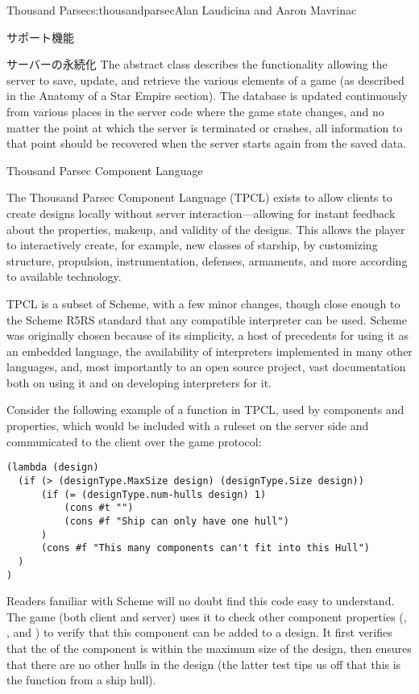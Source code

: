 \begin{aosachapter}{Thousand Parsec}{s:thousandparsec}{Alan Laudicina and Aaron Mavrinac}
\begin{aosasect1}{サポート機能}
\begin{aosasect2}{サーバーの永続化}
The abstract  class describes the functionality
allowing the server to save, update, and retrieve the various elements
of a game (as described in the Anatomy of a Star Empire section). The
database is updated continuously from various places in the server
code where the game state changes, and no matter the point at which
the server is terminated or crashes, all information to that point
should be recovered when the server starts again from the saved data.

\end{aosasect2}

\begin{aosasect2}{Thousand Parsec Component Language}

The Thousand Parsec Component Language (TPCL) exists to allow clients
to create designs locally without server interaction---allowing for
instant feedback about the properties, makeup, and validity of the
designs. This allows the player to interactively create, for example,
new classes of starship, by customizing structure, propulsion,
instrumentation, defenses, armaments, and more according to available
technology.

TPCL is a subset of Scheme, with a few minor changes, though close
enough to the Scheme R5RS standard that any compatible interpreter can
be used. Scheme was originally chosen because of its simplicity, a
host of precedents for using it as an embedded language, the
availability of interpreters implemented in many other languages, and,
most importantly to an open source project, vast documentation both on
using it and on developing interpreters for it.

Consider the following example of a  function in
TPCL, used by components and properties, which would be included with
a ruleset on the server side and communicated to the client over the
game protocol:

\begin{verbatim}
(lambda (design)
  (if (> (designType.MaxSize design) (designType.Size design))
      (if (= (designType.num-hulls design) 1)
          (cons #t "")
          (cons #f "Ship can only have one hull")
      )
      (cons #f "This many components can't fit into this Hull")
  )
)
\end{verbatim}

Readers familiar with Scheme will no doubt find this code easy to
understand. The game (both client and server) uses it to check other
component properties (, , and
) to verify that this component can be added to a
design. It first verifies that the  of the component is
within the maximum size of the design, then ensures that there are no
other hulls in the design (the latter test tips us off that this is
the  function from a ship hull).


\end{aosasect2}
\end{aosasect1}
\end{aosachapter}
